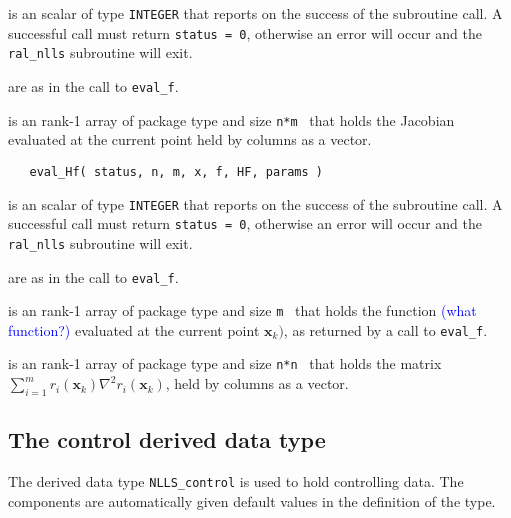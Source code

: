 \documentclass{hslspec}
\newcommand{\scalarintegerio}{is an \intentout scalar of type {\tt INTEGER} }
\newcommand{\ronearrayrealii}[1]{is an \intentin rank-1 array of package type and size {\tt #1}\ }
\newcommand{\ronearrayrealio}[1]{is an \intentout rank-1 array of package type and size {\tt #1}\ }
\begin{document}
\begin{description}
   \scalarintegerio that reports on the success of the subroutine call.  
  A successful call must return {\tt status = 0}, otherwise an error will occur 
  and the {\tt ral\_nlls} subroutine will exit.

   are as in the call to {\tt eval\_f}.

  
   \ronearrayrealio{n*m} that holds the Jacobian evaluated at the current point held by columns as a vector.
  
\end{description}

\begin{verbatim}
   eval_Hf( status, n, m, x, f, HF, params )
\end{verbatim}

\begin{description}
   \scalarintegerio that reports on the success of the subroutine call.  
  A successful call must return {\tt status = 0}, otherwise an error will occur and the {\tt ral\_nlls} subroutine 
  will exit.

   are as in the call to {\tt eval\_f}.

  
   \ronearrayrealii{m} that holds the function \textcolor{blue}{(what function?)}
  evaluated at the current point ${\bm x}_k)$, 
  as returned by a call to {\tt eval\_f}.

   \ronearrayrealio{n*n} that holds the matrix $\sum_{i = 1}^m r_i({\bm x}_k)\nabla^2r_i({\bm x}_k)$, held by columns as a vector.
  
\end{description}



\subsection{The control derived data type}
\label{typecontrol} 

The derived data type {\tt NLLS\_control} 
is used to hold controlling data. The components  are automatically 
given default values in the definition of the type.

\vspace{2mm}
\end{document}
